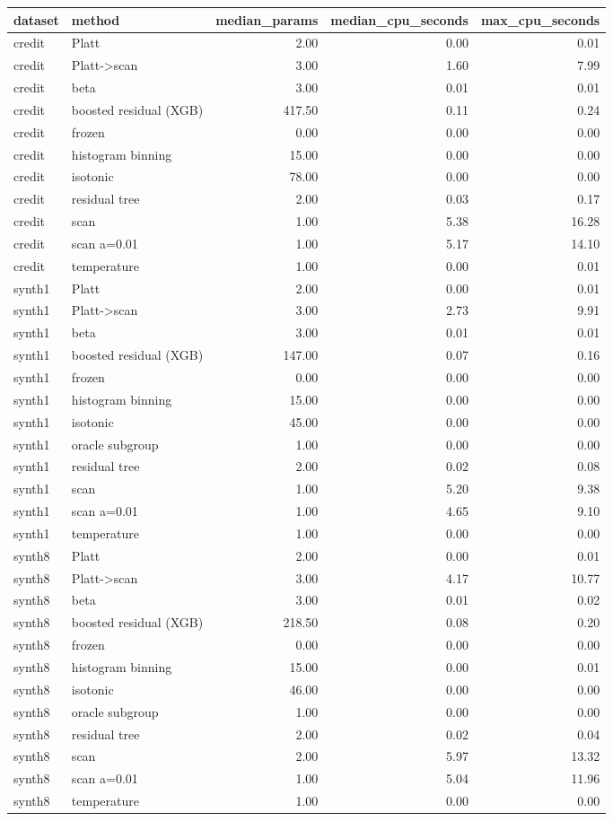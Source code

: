 \begin{tabular}{llrrr}
\toprule
dataset & method & median_params & median_cpu_seconds & max_cpu_seconds \\
\midrule
credit & Platt & 2.00 & 0.00 & 0.01 \\
credit & Platt->scan & 3.00 & 1.60 & 7.99 \\
credit & beta & 3.00 & 0.01 & 0.01 \\
credit & boosted residual (XGB) & 417.50 & 0.11 & 0.24 \\
credit & frozen & 0.00 & 0.00 & 0.00 \\
credit & histogram binning & 15.00 & 0.00 & 0.00 \\
credit & isotonic & 78.00 & 0.00 & 0.00 \\
credit & residual tree & 2.00 & 0.03 & 0.17 \\
credit & scan & 1.00 & 5.38 & 16.28 \\
credit & scan a=0.01 & 1.00 & 5.17 & 14.10 \\
credit & temperature & 1.00 & 0.00 & 0.01 \\
synth1 & Platt & 2.00 & 0.00 & 0.01 \\
synth1 & Platt->scan & 3.00 & 2.73 & 9.91 \\
synth1 & beta & 3.00 & 0.01 & 0.01 \\
synth1 & boosted residual (XGB) & 147.00 & 0.07 & 0.16 \\
synth1 & frozen & 0.00 & 0.00 & 0.00 \\
synth1 & histogram binning & 15.00 & 0.00 & 0.00 \\
synth1 & isotonic & 45.00 & 0.00 & 0.00 \\
synth1 & oracle subgroup & 1.00 & 0.00 & 0.00 \\
synth1 & residual tree & 2.00 & 0.02 & 0.08 \\
synth1 & scan & 1.00 & 5.20 & 9.38 \\
synth1 & scan a=0.01 & 1.00 & 4.65 & 9.10 \\
synth1 & temperature & 1.00 & 0.00 & 0.00 \\
synth8 & Platt & 2.00 & 0.00 & 0.01 \\
synth8 & Platt->scan & 3.00 & 4.17 & 10.77 \\
synth8 & beta & 3.00 & 0.01 & 0.02 \\
synth8 & boosted residual (XGB) & 218.50 & 0.08 & 0.20 \\
synth8 & frozen & 0.00 & 0.00 & 0.00 \\
synth8 & histogram binning & 15.00 & 0.00 & 0.01 \\
synth8 & isotonic & 46.00 & 0.00 & 0.00 \\
synth8 & oracle subgroup & 1.00 & 0.00 & 0.00 \\
synth8 & residual tree & 2.00 & 0.02 & 0.04 \\
synth8 & scan & 2.00 & 5.97 & 13.32 \\
synth8 & scan a=0.01 & 1.00 & 5.04 & 11.96 \\
synth8 & temperature & 1.00 & 0.00 & 0.00 \\
\bottomrule
\end{tabular}
